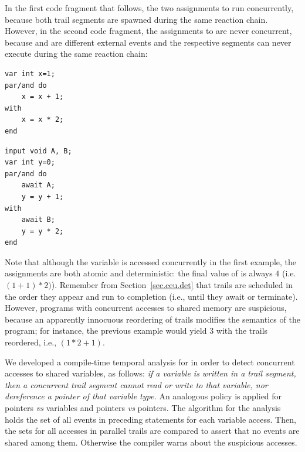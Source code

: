 In the first code fragment that follows, the two assignments to  run 
concurrently, because both trail segments are spawned during the same reaction 
chain.
However, in the second code fragment, the assignments to  are never 
concurrent, because  and  are different external events and the 
respective segments can never execute during the same reaction chain:

\nopagebreak
\noindent
\begin{minipage}[t]{0.45\linewidth}
\begin{lstlisting}
var int x=1;
par/and do
    x = x + 1;
with
    x = x * 2;
end
\end{lstlisting}
\end{minipage}
%
\begin{minipage}[t]{0.45\linewidth}
\begin{lstlisting}
input void A, B;
var int y=0;
par/and do
    await A;
    y = y + 1;
with
    await B;
    y = y * 2;
end
\end{lstlisting}
\end{minipage}

Note that although the variable  is accessed concurrently in the first 
example, the assignments are both atomic and deterministic: the final value of 
 is always $4$ (i.e. {\small$(1+1)*2)$}).
%
Remember from Section~\ref{sec.ceu.det} that trails are scheduled in the order 
they appear and run to completion (i.e., until they await or 
terminate).
%
However, programs with concurrent accesses to shared memory are suspicious, 
because an apparently innocuous reordering of trails modifies the semantics of 
the program; for instance, the previous example would yield $3$ with the trails 
reordered, i.e., {\small$(1*2+1)$}.


We developed a compile-time temporal analysis for \CEU in order to detect 
concurrent accesses to shared variables, as follows:
\emph{if a variable is written in a trail segment, then a concurrent trail 
segment cannot read or write to that variable, nor dereference a pointer of 
that variable type.}
An analogous policy is applied for pointers \emph{vs} variables and pointers 
\emph{vs} pointers.
The algorithm for the analysis holds the set of all events in preceding 
 statements for each variable access.
Then, the sets for all accesses in parallel trails are compared to assert that 
no events are shared among them.
Otherwise the compiler warns about the suspicious accesses.

